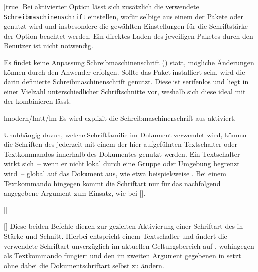\begin{Declaration*}{}
\begin{Declaration*}{}
\begin{Declaration*}{}
\begin{Declaration}[v2.06]{}[true]%
\printdeclarationlist%
%
%
%
Bei aktivierter Option  lässt sich zusätzlich die verwendete
\texttt{Schreibmaschinenschrift} einstellen, wofür selbige aus einem der Pakete 
 oder  genutzt wird und insbesondere die 
gewählten Einstellungen für die Schriftstärke der Option  
beachtet werden. Ein direktes Laden des jeweiligen Paketes durch den Benutzer 
ist nicht notwendig.
%
\begin{values}{}
\itemfalse
  Es findet keine Anpassung Schreibmaschinenschrift () statt, 
  mögliche Änderungen können durch den Anwender erfolgen.
  Sollte das Paket  installiert sein, wird die darin 
  definierte Schreibmaschinenschrift genutzt. Diese ist serifenlos und liegt in 
  einer Vielzahl unterschiedlicher Schriftschnitte vor, weshalb sich diese 
  ideal mit der \OpenSans kombinieren lässt.
\item[lmodern/lmtt/lm]
  Es wird explizit die Schreibmaschinenschrift aus  aktiviert. 
\end{values}
\end{Declaration}



%
%
%
Unabhängig davon, welche Schriftfamilie im Dokument verwendet wird, können die 
Schriften des \CDs jederzeit mit einem der hier aufgeführten Textschalter oder 
Textkommandos innerhalb des Dokumentes genutzt werden. Ein Textschalter wirkt 
sich~-- wenn er nicht lokal durch eine Gruppe oder Umgebung begrenzt wird~-- 
global auf das Dokument aus, wie etwa beispielsweise . Bei 
einem Textkommando hingegen kommt die Schriftart nur für das nachfolgend 
angegebene Argument zum Einsatz, wie bei []. 
%
\begin{Declaration}[v2.04]{[]}
\begin{Declaration}[v2.04]{%
  []%
}
\printdeclarationlist
Diese beiden Befehle dienen zur gezielten Aktivierung einer Schriftart des \CDs 
in Stärke und Schnitt. Hierbei entspricht  einem Textschalter und 
ändert die verwendete Schriftart unverzüglich im aktuellen Geltungsbereich auf 
, wohingegen  als Textkommando fungiert und den 
im zweiten Argument gegebenen  in  setzt ohne 
dabei die Dokumentschriftart selbst zu ändern.


\end{Declaration}
\end{Declaration}
\end{Declaration*}
\end{Declaration*}
\end{Declaration*}
